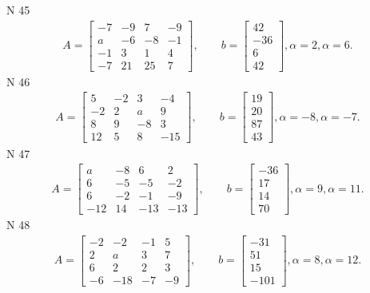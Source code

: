 \documentclass[11pt]{report}
\begin{document}
N 45
\begin{align*}
 A = \left[\begin{matrix}-7 & -9 & 7 & -9\\a & -6 & -8 & -1\\-1 & 3 & 1 & 4\\-7 & 21 & 25 & 7\end{matrix}\right],
    \qquad b = \left[\begin{matrix}42\\-36\\6\\42\end{matrix}\right], \alpha = 2, \alpha = 6. 
 \end{align*}
N 46
\begin{align*}
 A = \left[\begin{matrix}5 & -2 & 3 & -4\\-2 & 2 & a & 9\\8 & 9 & -8 & 3\\12 & 5 & 8 & -15\end{matrix}\right],
    \qquad b = \left[\begin{matrix}19\\20\\87\\43\end{matrix}\right], \alpha = -8, \alpha = -7. 
 \end{align*}
N 47
\begin{align*}
 A = \left[\begin{matrix}a & -8 & 6 & 2\\6 & -5 & -5 & -2\\6 & -2 & -1 & -9\\-12 & 14 & -13 & -13\end{matrix}\right],
    \qquad b = \left[\begin{matrix}-36\\17\\14\\70\end{matrix}\right], \alpha = 9, \alpha = 11. 
 \end{align*}
N 48
\begin{align*}
 A = \left[\begin{matrix}-2 & -2 & -1 & 5\\2 & a & 3 & 7\\6 & 2 & 2 & 3\\-6 & -18 & -7 & -9\end{matrix}\right],
    \qquad b = \left[\begin{matrix}-31\\51\\15\\-101\end{matrix}\right], \alpha = 8, \alpha = 12. 
 \end{align*}
\end{document}
